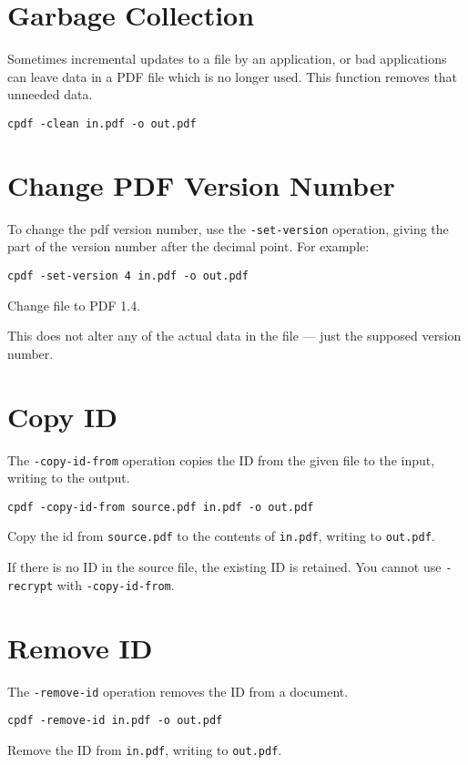 \documentclass{book}
\begin{document}
  \section{Garbage Collection}
  Sometimes incremental updates to a file by an application, or bad
applications can leave data in a PDF file which is no longer used. This
function removes that unneeded data.

  \begin{framed}
  \small\noindent\verb!cpdf -clean in.pdf -o out.pdf!
  \end{framed}
 
  \section{Change PDF Version Number}
   \label{setversion}
   To change the pdf version number, use the \texttt{-set-version} operation,
giving the part of the version number after the decimal point. For example:
  \begin{framed}
  \small\noindent\verb!cpdf -set-version 4 in.pdf -o out.pdf!

  \vspace{2.5mm}
  \noindent Change file to PDF 1.4.
  \end{framed} 
  \noindent This does not alter any of the actual data in the file ---
just the supposed version number.

  \section{Copy ID}
  The \texttt{-copy-id-from} operation copies the ID from the given file to the
input, writing to the output.
  \begin{framed}
  \small\noindent\verb!cpdf -copy-id-from source.pdf in.pdf -o out.pdf!

  \vspace{2.5mm}
  \noindent Copy the id from \texttt{source.pdf} to the contents of \texttt{in.pdf}, writing to \texttt{out.pdf}.
  \end{framed}
  \noindent If there is no ID in the source file, the existing ID is retained. You cannot use \texttt{-recrypt} with \texttt{-copy-id-from}.

\section{Remove ID}
  The \texttt{-remove-id} operation removes the ID from a document.
  \begin{framed}
  \small\noindent\verb!cpdf -remove-id in.pdf -o out.pdf!

  \vspace{2.5mm}
  \noindent Remove the ID from \texttt{in.pdf}, writing to \texttt{out.pdf}.
  \end{framed}
\end{document}
